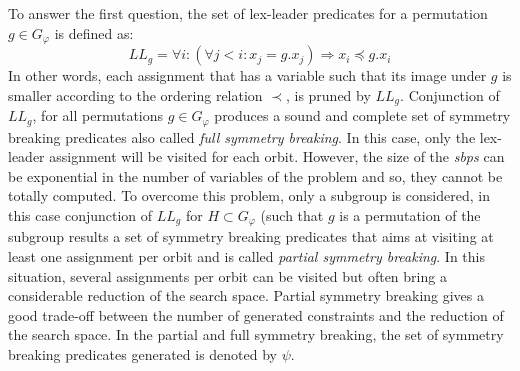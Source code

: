 To answer the first question, the set of lex-leader predicates for a permutation $g \in G_\varphi$ is defined as:
$$LL_g = \forall i : (\forall j < i : x_j = g.x_j) \Rightarrow  x_i \preceq g.x_i$$
In other words, each assignment that has a variable such that its image under $g$ is smaller according to the ordering relation $\prec$, is pruned by $LL_g$.
Conjunction of $LL_g$, for all permutations  $g \in G_{\varphi} $ produces a sound and complete set of symmetry breaking predicates also called \emph{full symmetry breaking}.
In this case, only the lex-leader assignment will be visited for each orbit.
However, the size of the \textit{sbps} can be exponential in the number of variables of the problem and so, they cannot be totally computed.
To overcome this problem, only a subgroup is considered, in this case 
conjunction of $LL_g$ for $H \subset G_{\varphi}$ (such that $g$ is a permutation of the subgroup results a set of symmetry breaking predicates 
that aims at visiting at least one assignment per orbit and is called \emph{partial symmetry breaking}.
In this situation, several assignments per orbit can be visited but often bring a considerable reduction of the
search space. Partial symmetry breaking gives a good trade-off between the number of generated constraints and the reduction of the search space.
In the partial and full symmetry breaking, the set of symmetry breaking predicates generated is denoted by $\psi$.
%
%

